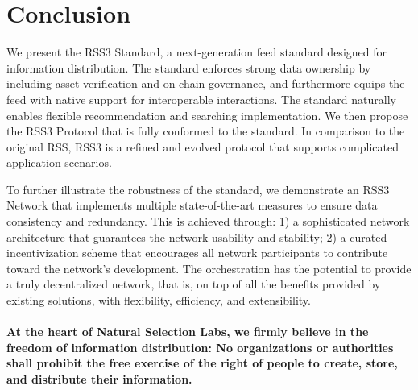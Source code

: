 \section{Conclusion} 


We present the RSS3 Standard, a next-generation feed standard designed for information distribution. The standard enforces strong data ownership by including asset verification and on chain governance, and furthermore equips the feed with native support for interoperable interactions. The standard naturally enables flexible recommendation and searching implementation. We then propose the RSS3 Protocol that is fully conformed to the standard. In comparison to the original RSS, RSS3 is a refined and evolved protocol that supports complicated application scenarios.

To further illustrate the robustness of the standard, we demonstrate an RSS3 Network that implements multiple state-of-the-art measures to ensure data consistency and redundancy. This is achieved through: 1) a sophisticated network architecture that guarantees the network usability and stability; 2) a curated incentivization scheme that encourages all network participants to contribute toward the network's development. The orchestration has the potential to provide a truly decentralized network, that is, on top of all the benefits provided by existing solutions, with flexibility, efficiency, and extensibility.
\\
\\

\textbf{At the heart of Natural Selection Labs, we firmly believe in the freedom of information distribution: No organizations or authorities shall prohibit the free exercise of the right of people to create, store, and distribute their information.}